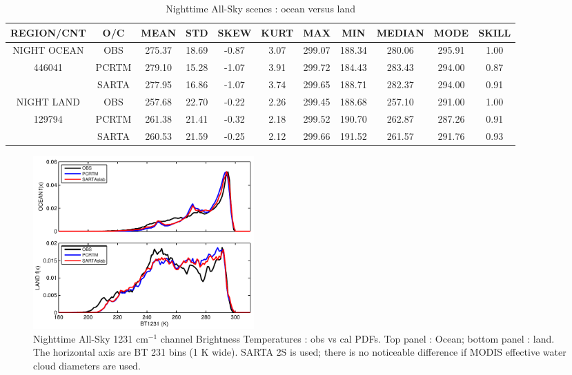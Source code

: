 \documentclass[agupp]{aguplus}              %
\newcommand{\wn}{cm$^{-1}$\xspace}
\begin{document}
\begin{article}
\begin{center}
\begin{table}[ht]
{\small
\hfill{}
\begin{tabular}{ccccccccccc} %
\hline\hline %
  REGION/CNT    & O/C & MEAN  & STD & SKEW & KURT & MAX & MIN & MEDIAN & MODE & SKILL\\
\hline
NIGHT OCEAN   & OBS   & 275.37 & 18.69  & -0.87 &  3.07 & 299.07 & 188.34 & 280.06 & 295.91 &  1.00 \\
   446041        & PCRTM & 279.10 & 15.28  & -1.07 &  3.91 & 299.72 & 184.43 & 283.43 & 294.00 &  0.87 \\ 
              & SARTA & 277.95 & 16.86  & -1.07 &  3.74 & 299.65 & 188.71 & 282.37 & 294.00 & 0.91 \\
\hline
NIGHT LAND    & OBS   & 257.68 & 22.70  & -0.22 &  2.26 & 299.45 & 188.68 & 257.10 & 291.00 &  1.00  \\
   129794        & PCRTM & 261.38 & 21.41  & -0.32 &  2.18 & 299.52 & 190.70 & 262.87 & 287.26 & 0.91 \\
              & SARTA & 260.53 & 21.59  & -0.25 &  2.12 & 299.66 & 191.52 & 261.57 & 291.76 & 0.93 \\
\hline %
\end{tabular}}
\hfill{}
\caption{Nighttime All-Sky scenes : ocean versus land}
\label{table:allsky_all} %
\end{table}
\end{center}

\begin{figure}[h]
\noindent\includegraphics[width=20pc]{FIGS/ecm_cloudBT1231_gev_land_ocean}
\caption{Nighttime All-Sky 1231 \wn channel Brightness Temperatures : obs vs cal PDFs.
Top panel : Ocean; bottom panel : land. The horizontal axis are BT 231 bins (1 K wide). SARTA 2S is used; there is no noticeable
difference if MODIS effective water cloud diameters are used.}
\label{bt1231_night_allsky_land_ocean}
\end{figure}


\end{article}
\end{document}
